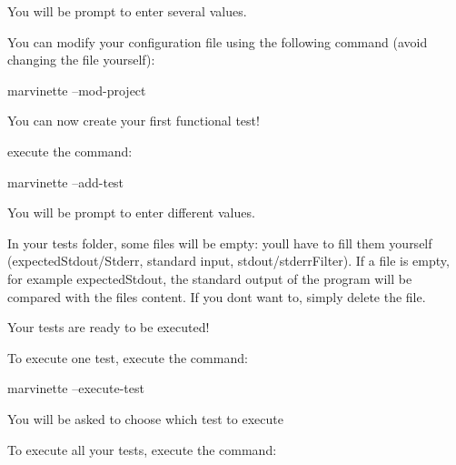 \begin{DoxyItemize}
\item You will be prompt to enter several values.
\item You can modify your configuration file using the following command (avoid changing the file yourself)\+:
\end{DoxyItemize}


\begin{DoxyCode}
marvinette --mod-project
\end{DoxyCode}



\begin{DoxyEnumerate}
\item You can now create your first functional test!
\begin{DoxyItemize}
\item execute the command\+:
\end{DoxyItemize}
\end{DoxyEnumerate}


\begin{DoxyCode}
marvinette --add-test
\end{DoxyCode}



\begin{DoxyItemize}
\item You will be prompt to enter different values.
\item In your test\textquotesingle{}s folder, some files will be empty\+: you\textquotesingle{}ll have to fill them yourself (expected\+Stdout/\+Stderr, standard input, stdout/stderr\+Filter). If a file is empty, for example expected\+Stdout, the standard output of the program will be compared with the file\textquotesingle{}s content. If you don\textquotesingle{}t want to, simply delete the file.
\end{DoxyItemize}

Your tests are ready to be executed!
\begin{DoxyItemize}
\item To execute one test, execute the command\+:
\end{DoxyItemize}


\begin{DoxyCode}
marvinette --execute-test
\end{DoxyCode}


You will be asked to choose which test to execute
\begin{DoxyItemize}
\item To execute all your tests, execute the command\+:
\end{DoxyItemize}


